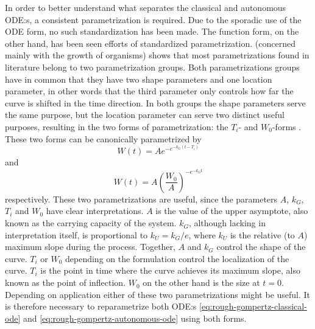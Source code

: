 In order to better understand what separates the classical and autonomous ODE:s, a consistent parametrization is required.
Due to the sporadic use of the ODE form, no such standardization has been made.
The function form, on the other hand, has been seen efforts of standardized parametrization.
\cite{tjorve2017gompertz} (concerned mainly with the growth of organisms) shows that most parametrizations found in literature belong to two parametrization groups.
Both parametrizations groups have in common that they have two shape parameters and one location parameter, in other words that the third parameter only controls how far the curve is shifted in the time direction.
In both groups the shape parameters serve the same purpose, but the location parameter can serve two distinct useful purposes, resulting in the two forms of parametrization: the \(T_i\)- and \(W_0\)-forms \cite{tjorve2017gompertz}.
These two forms can be canonically parametrized by
\begin{equation} \label{eq:gompertz-ti-function}
  W(t) = A e^{-e^{-k_G(t-T_i)}}
\end{equation}
and
\begin{equation} \label{eq:gompertz-w0-function}
  W(t) = A \left(\frac{W_0}{A}\right)^{-e^{-k_G t}}
\end{equation}
respectively.
These two parametrizations are useful, since the parameters \(A\), \(k_G\), \(T_i\) and \(W_0\) have clear interpretations.
\(A\) is the value of the upper asymptote, also known as the carrying capacity of the system.
\(k_G\), although lacking in interpretation itself, is proportional to \(k_U = k_G / e\), where \(k_U\) is the relative (to \(A\)) maximum slope during the process.
Together, \(A\) and \(k_G\) control the shape of the curve.
\(T_i\) or \(W_0\) depending on the formulation control the localization of the curve.
\(T_i\) is the point in time where the curve achieves its maximum slope, also known as the point of inflection.
\(W_0\) on the other hand is the size at \(t=0\).
Depending on application either of these two parametrizations might be useful.
It is therefore necessary to reparametrize both ODE:s \ref{eq:rough-gompertz-classical-ode} and \ref{eq:rough-gompertz-autonomous-ode} using both forms.

